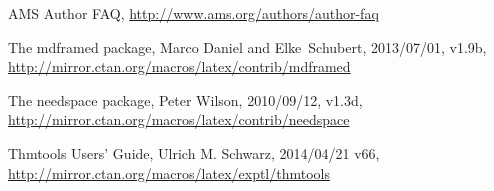 \documentclass[a4paper, 11pt]{report}
\newcommand{\ntt}{%
  \fontfamily\ttdefault \fontseries\mddefault \fontshape\updefault
  \selectfont
}
\DeclareRobustCommand{\pkg}[1]{{\ntt#1}}
\renewcommand{\<}{\langle}
\renewcommand{\>}{\rangle}
\begin{document}
\begin{thebibliography}{[MDF]}

\raggedright

 AMS Author FAQ,
  \url{http://www.ams.org/authors/author-faq}

 The \pkg{mdframed} package,
  Marco Daniel and Elke~Schubert, 2013/07/01, v1.9b,
  \url{http://mirror.ctan.org/macros/latex/contrib/mdframed}

 The \pkg{needspace} package,
  Peter Wilson, 2010/09/12, v1.3d,
  \url{http://mirror.ctan.org/macros/latex/contrib/needspace}

 \pkg{Thmtools} Users' Guide,
  Ulrich M. Schwarz, 2014/04/21 v66,
  \url{http://mirror.ctan.org/macros/latex/exptl/thmtools}

\end{thebibliography}
\end{document}
